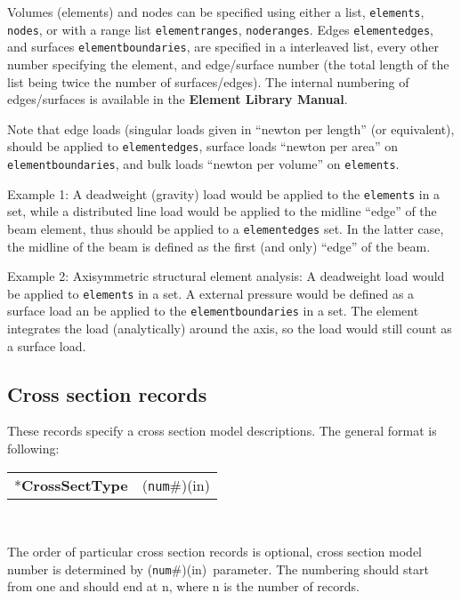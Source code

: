 \documentclass[a4paper]{article}
\newcommand{\param}[1]{\texttt{#1}} %
\newcommand{\componentNum}{(\param{num}\#){\tiny(in)}} %
\newcommand{\entKeyword}[1]{*\textbf{#1}} %
\newenvironment{record}[1][]{\begin{tabular}{|ll}}{\end{tabular}\\}
\newcommand{\recentry}[2]{{#1}&{#2}\\}
\newcounter{rcc}
\newenvironment{record}[1][\textwidth]{\setcounter{rcc}{0}\rowcolors{1}{lightgray}{lightgray}\tabularx{#1}{llR} \hline}
               {\endtabularx}
\newcommand{\recentry}[2]{\ifthenelse{\value{rcc}>0}{$\backslash$ \\}{\setcounter{rcc}{1}}{#1}&{#2}&}
\begin{document}
Volumes (elements) and nodes can be specified using either a list, \param{elements}, \param{nodes}, or with a range list \param{elementranges}, \param{noderanges}.
Edges \param{elementedges}, and surfaces \param{elementboundaries}, are specified in a interleaved list, every other number specifying the element, and edge/surface number (the total length of the list being twice the number of surfaces/edges).
The internal numbering of edges/surfaces is available in the \textbf{Element Library Manual}.

Note that edge loads (singular loads given in ``newton per length'' (or equivalent), should be applied to \param{elementedges}, surface loads ``newton per area'' on \param{elementboundaries}, and bulk loads ``newton per volume'' on \param{elements}.

Example 1: A deadweight (gravity) load would be applied to the \param{elements} in a set, while a distributed line load would be applied to the midline ``edge'' of the beam element, thus should be applied to a \param{elementedges} set. In the latter case, the midline of the beam is defined as the first (and only) ``edge'' of the beam.

Example 2: Axisymmetric structural element analysis: A deadweight load would be applied to \param{elements} in a set. A external pressure would be defined as a surface load an be applied to the \param{elementboundaries} in a set. The element integrates the load (analytically) around the axis, so the load would still count as a surface load.


\subsection{Cross section records}
\label{_CrossSectionRecords}
These records specify a cross section model descriptions. The general format is
following:

\begin{record}[0.9\textwidth]
  \recentry{\entKeyword{CrossSectType}}{\componentNum}
\end{record}

The order of particular cross section records is optional, cross section model number is determined by \componentNum\ parameter.
The numbering should start from one and should end at n, where n is the number of records.
\end{document}
